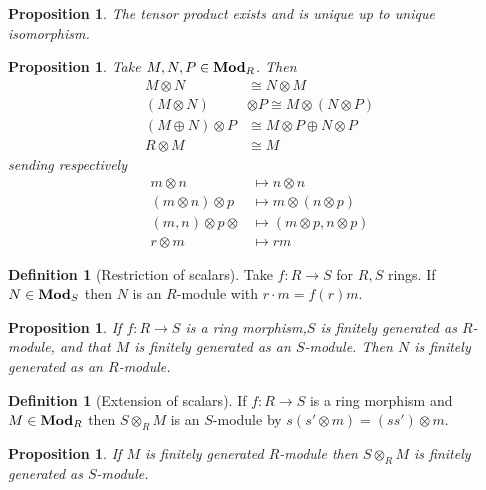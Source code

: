 \documentclass{article}
\DeclareMathOperator{\modules}{{\bf Mod}}
\newtheorem{proposition}[theorem]{Proposition}
\theoremstyle{definition}
\newtheorem{definition}[theorem]{Definition}
\begin{document}
\begin{proposition}
    The tensor product exists and is unique up to unique isomorphism.
\end{proposition}

\begin{proposition}
    Take \(M,N,P\in\modules_{R}\). Then
    \begin{align*}
        M\otimes N           & \cong N\otimes M                    \\
        (M\otimes N)         & \otimes P\cong M\otimes(N\otimes P) \\
        (M\oplus N)\otimes P & \cong M\otimes P\oplus N\otimes P   \\
        R\otimes M           & \cong M
    \end{align*}
    sending respectively
    \begin{align*}
        m\otimes n            & \mapsto n\otimes n             \\
        (m\otimes n)\otimes p & \mapsto m\otimes(n\otimes p)   \\
        (m,n)\otimes p\otimes & \mapsto(m\otimes p,n\otimes p) \\
        r\otimes m            & \mapsto rm
    \end{align*}
\end{proposition}

\begin{definition}[Restriction of scalars]
    Take \(f:R\to S\) for \(R,S\) rings. If \(N\in\modules_{S}\) then
    \(N\) is an \(R\)-module with \(r\cdot m=f(r)m\).
\end{definition}

\begin{proposition}
    If \(f:R\to S\) is a ring morphism,\(S\) is finitely generated as
    \(R\)-module, and that \(M\) is finitely generated as an \(S\)-module. Then
    \(N\) is finitely generated as an \(R\)-module.
\end{proposition}

\begin{definition}[Extension of scalars]
    If \(f:R\to S\) is a ring morphism and \(M\in\modules_{R}\) then
    \(S\otimes_{R}M\) is an \(S\)-module by \(s(s'\otimes m)=(ss')\otimes m\).
\end{definition}

\begin{proposition}
    If \(M\) is finitely generated \(R\)-module then \(S\otimes_{R} M\) is
    finitely generated as \(S\)-module.
\end{proposition}
\end{document}
